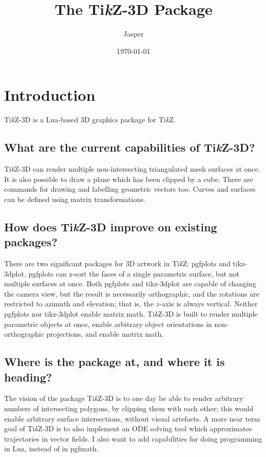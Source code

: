 \documentclass[12pt]{report}
\title{The Ti\textit{k}Z-3D Package}
\author{Jasper}
\date{\today}
\begin{document}
    \maketitle 
    \tableofcontents
    \chapter{Introduction}
        Ti\textit{k}Z-3D is a Lua-based 3D graphics package for 
        Ti\textit{k}Z.
        \section{What are the current capabilities of Ti\textit{k}Z-3D?}
            Ti\textit{k}Z-3D can render multiple non-intersecting 
            triangulated mesh surfaces at once. It is also possible 
            to draw a plane which has been clipped by a cube.
            There are commands for drawing and labelling geometric 
            vectors too. Curves and surfaces can be defined using 
            matrix transformations.
        \section{
            How does Ti\textit{k}Z-3D improve on existing packages?
        }
            There are two significant packages for 3D artwork in 
            Ti\textit{k}Z: pgfplots and tikz-3dplot.
            pgfplots can z-sort the faces of a single parametric 
            surface, but not multiple surfaces at once.
            Both pgfplots and tikz-3dplot are capable of changing 
            the camera view, but the result is necessarily 
            orthographic, and the rotations are restricted to 
            azimuth and elevation; that is, the \(z\)-axis is always 
            vertical. Neither pgfplots nor tikz-3dplot enable 
            matrix math. Ti\textit{k}Z-3D is built to render 
            multiple parametric objects at once, enable arbitrary
            object orientations in non-orthographic projections, 
            and enable matrix math.
        \section{Where is the package at, and where it is heading?}
            The vision of the package Ti\textit{k}Z-3D is to one 
            day be able to render arbitrary numbers of intersecting 
            polygons, by clipping them with each other; this would 
            enable arbitrary surface intersections, without 
            visual artefacts. A more near term goal of 
            Ti\textit{k}Z-3D is to also implement an ODE 
            solving tool which approximates trajectories in 
            vector fields. I also want to add capabilities for 
            doing programming in Lua, instead of in pgfmath.
\end{document}
